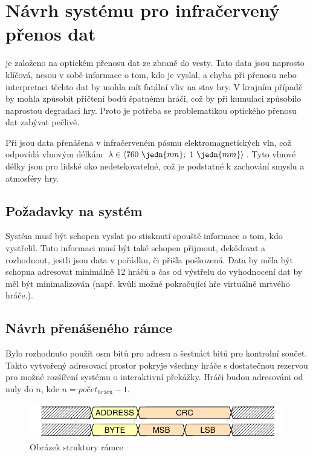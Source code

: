 \chapter{Návrh systému pro infračervený přenos dat}
 je založeno na optickém přenosu dat ze zbraně do vesty. Tato data jsou naprosto klíčová, nesou v sobě informace o tom, kdo je vyslal, a chyba při přenosu nebo interpretaci těchto dat by mohla mít fatální vliv na stav hry. V krajním případě by mohla způsobit přičtení bodů špatnému hráči, což by při kumulaci způsobilo naprostou degradaci hry. Proto je potřeba se problematikou optického přenosu dat zabývat pečlivě.

Při  jsou data přenášena v infračerveném pásmu elektromagnetických vln, což odpovídá vlnovým délkám $\lambda \in \langle 760~\jedn{nm};~1~\jedn{mm}\rangle$. Tyto vlnové délky jsou pro lidské oko nedetekovatelné, což je podstatné k zachování smyslu a atmosféry hry.

\section{Požadavky na systém}
Systém musí být schopen vyslat po stisknutí spouště informace o tom, kdo vystřelil. Tuto informaci musí být také schopen přijmout, dekódovat a rozhodnout, jestli jsou data v pořádku, či přišla poškozená. Data by měla být schopna adresovat minimálně 12 hráčů a čas od výstřelu do vyhodnocení dat by měl být minimalizován (např. kvůli možné pokračující hře virtuálně mrtvého hráče.).

\section{Návrh přenášeného rámce}
Bylo rozhodnuto použít osm bitů pro adresu a šestnáct bitů pro kontrolní součet. Takto vytvořený adresovací prostor pokryje všechny hráče s dostatečnou rezervou pro možné rozšíření systému o interaktivní překážky. Hráči budou adresováni od nuly do $n$, kde $n = počet _{hráčů} - 1$.

\begin{figure}[H]
    \begin{center}
        \includegraphics[width=\textwidth]{img/ir-packet}
    \end{center}
    \caption{Obrázek struktury rámce}
\end{figure}

